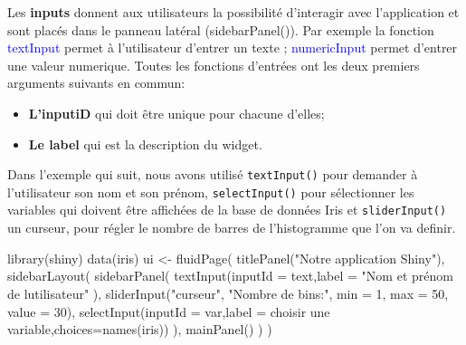 \documentclass[
]{article}
\newenvironment{Shaded}{\begin{snugshade}}{\end{snugshade}}
\newcommand{\AttributeTok}[1]{\textcolor[rgb]{0.77,0.63,0.00}{#1}}
\newcommand{\DecValTok}[1]{\textcolor[rgb]{0.00,0.00,0.81}{#1}}
\newcommand{\FunctionTok}[1]{\textcolor[rgb]{0.00,0.00,0.00}{#1}}
\newcommand{\NormalTok}[1]{#1}
\newcommand{\OtherTok}[1]{\textcolor[rgb]{0.56,0.35,0.01}{#1}}
\newcommand{\StringTok}[1]{\textcolor[rgb]{0.31,0.60,0.02}{#1}}
\begin{document}
Les \textbf{inputs} donnent aux utilisateurs la possibilité d'interagir
avec l'application et sont placés dans le panneau latéral
(sidebarPanel()). Par exemple la fonction \textcolor{blue}{textInput}
permet à l'utilisateur d'entrer un texte ;
\textcolor{blue}{numericInput} permet d'entrer une valeur numerique.
Toutes les fonctions d'entrées ont les deux premiers arguments suivants
en commun:

\begin{itemize}
\item
  \textbf{L'inputiD} qui doit être unique pour chacune d'elles;
\item
  \textbf{Le label} qui est la description du widget.
\end{itemize}

Dans l'exemple qui suit, nous avons utilisé \texttt{textInput()} pour
demander à l'utilisateur son nom et son prénom, \texttt{selectInput()}
pour sélectionner les variables qui doivent être affichées de la base de
données Iris et \texttt{sliderInput()} un curseur, pour régler le nombre
de barres de l'histogramme que l'on va definir.

\begin{Shaded}
\begin{Highlighting}[]
\FunctionTok{library}\NormalTok{(shiny)}
\FunctionTok{data}\NormalTok{(iris)}
\NormalTok{  ui }\OtherTok{\textless{}{-}} \FunctionTok{fluidPage}\NormalTok{(}
    \FunctionTok{titlePanel}\NormalTok{(}\StringTok{"Notre  application Shiny"}\NormalTok{),}
    \FunctionTok{sidebarLayout}\NormalTok{(  }
      \FunctionTok{sidebarPanel}\NormalTok{(  }
        \FunctionTok{textInput}\NormalTok{(}\AttributeTok{inputId =} \StringTok{\textquotesingle{}text\textquotesingle{}}\NormalTok{,}\AttributeTok{label =} \StringTok{"Nom et prénom de l\textquotesingle{}utilisateur"}\NormalTok{ ),}
        \FunctionTok{sliderInput}\NormalTok{(}\StringTok{"curseur"}\NormalTok{, }\StringTok{"Nombre de bins:"}\NormalTok{, }
                    \AttributeTok{min =} \DecValTok{1}\NormalTok{, }\AttributeTok{max =} \DecValTok{50}\NormalTok{, }\AttributeTok{value =} \DecValTok{30}\NormalTok{),}
       \FunctionTok{selectInput}\NormalTok{(}\AttributeTok{inputId =} \StringTok{\textquotesingle{}var\textquotesingle{}}\NormalTok{,}\AttributeTok{label =} \StringTok{\textquotesingle{}choisir une variable\textquotesingle{}}\NormalTok{,}\AttributeTok{choices=}\FunctionTok{names}\NormalTok{(iris))}
\NormalTok{  ),}
    \FunctionTok{mainPanel}\NormalTok{()}
\NormalTok{    )}
\NormalTok{)}
\end{Highlighting}
\end{Shaded}
\end{document}
